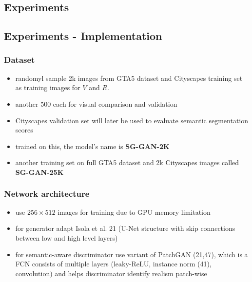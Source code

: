 \newpage

\subsection{Experiments}

\subsection{Experiments - Implementation}

\subsubsection{Dataset}
\begin{itemize}
	\item randomyl sample 2k images from GTA5 dataset and Cityscapes training set as training images for $V$ and $R$.
	\item another 500 each for visual comparison and validation
	\item Cityscapes validation set will later be used to evaluate semantic segmentation scores
	\item trained on this, the model's name is \textbf{SG-GAN-2K}
	\item another training set on full GTA5 dataset and 2k Cityscapes images called \textbf{SG-GAN-25K}
\end{itemize}

\subsubsection{Network architecture}
\begin{itemize}
	\item use $256 \times 512$ images for training due to GPU memory limitation
	\item for generator adapt Isola et al. 21 (U-Net structure with skip connections between low and high level layers)
	\item for semantic-aware discriminator use variant of PatchGAN (21,47), which is a FCN consists of multiple layers (leaky-ReLU, instance norm (41), convolution) and helps discriminator identify realism patch-wise
\end{itemize}

